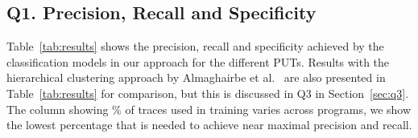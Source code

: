 


\subsection{Q1. Precision, Recall and Specificity} 

Table~\ref{tab:results} shows the precision, recall and specificity achieved by the classification models in our approach for the different PUTs. Results with the hierarchical clustering approach by Almaghairbe et al.~\cite{almaghairbe2017separating} are also presented in Table~\ref{tab:results} for comparison,  but this is discussed in Q3 in Section~\ref{sec:q3}. 
The column showing \% of traces used in training varies across programs, we show the lowest percentage that is needed to achieve {near maximal precision and recall}.  %

